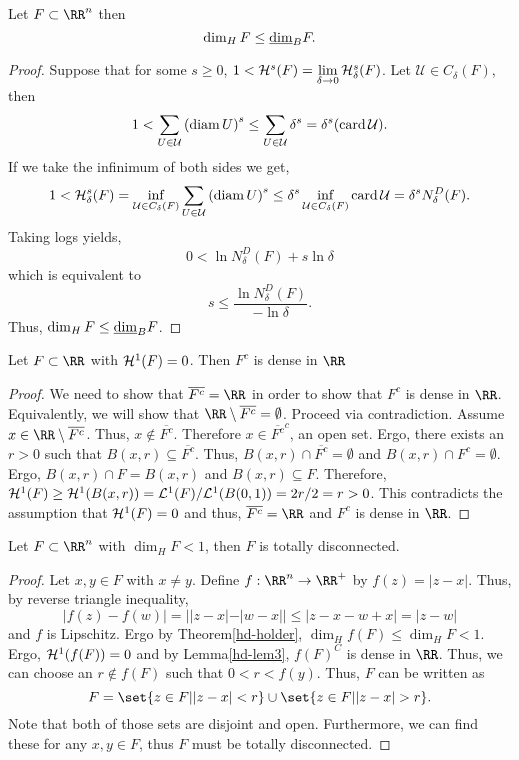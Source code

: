 \begin{thm}
	Let $F\subset\RR^n$ then
	\[
		\operatorname{dim}_H F \leq \underline{\operatorname{dim}}_B F.
	\]
\end{thm}
\begin{proof}
	Suppose that for some $s\geq 0$, $1<\mathcal{H}^s(F)=\lim\limits_{\delta\rightarrow 0}\mathcal{H}^s_\delta(F)$.
	Let $\mathcal{U}\in C_\delta(F)$, then
	\[
		1 < \sum_{U\in\mathcal{U}}{(\operatorname{diam} U)}^s
		\leq\sum_{U\in\mathcal{U}}\delta^s
		=\delta^s (\operatorname{card} \mathcal{U}).
	\]
	If we take the infinimum of both sides we get,
	\[
		1 < \mathcal{H}^s_\delta(F)
		=\inf_{\mathcal{U}\in C_\delta(F)}\sum_{U\in\mathcal{U}} {(\operatorname{diam}{U})}^s
		\leq \delta^s\inf_{\mathcal{U}\in C_\delta(F)}\operatorname{card}{\mathcal{U}}
		=\delta^s N_\delta^D(F).
	\]
	Taking logs yields,
	\[
		0 < \ln N_\delta^D(F)+s\ln \delta
	\]
	which is equivalent to
	\[
		s\leq \frac{\ln N^D_\delta(F)}{-\ln\delta}.
	\]
	Thus, $\operatorname{dim}_H F\leq \underline{\operatorname{dim}}_B F$.
\end{proof}

\begin{lemma}\label{hd-lem3}
	Let $F\subset\RR$ with $\mathcal{H}^1(F) = 0$.
	Then $F^c$ is dense in $\RR$
\end{lemma}

\begin{proof}
	We need to show that $\overline{F^c}=\RR$ in order to show that $F^c$ is dense in $\RR$.
	Equivalently, we will show that $\RR\setminus\overline{F^c}=\emptyset$.
	Proceed via contradiction.
	Assume $x\in\RR\setminus\overline{F^c}$.
	Thus, $x\notin\overline{F^c}$.
	Therefore $x\in{\overline{F^c}}^c$, an open set.
	Ergo, there exists an $r>0$ such that $B(x,r)\subseteq\overline{F^c}$.
	Thus, $B(x,r)\cap\overline{F^c}=\emptyset$ and $B(x,r)\cap F^c=\emptyset$.
	Ergo, $B(x,r)\cap F = B(x,r)$ and $B(x,r)\subseteq F$.
	Therefore, $\mathcal{H}^1(F)\geq\mathcal{H}^1(B(x,r))=\mathcal{L}^1(F)/\mathcal{L}^1(B(0,1))=2r/2=r>0$.
	This contradicts the assumption that $\mathcal{H}^1(F)=0$ and thus, $\overline{F^c}=\RR$ and $F^c$ is dense in $\RR$.
\end{proof}

\begin{thm}
	Let $F\subset\RR^n$ with $\dim_H F < 1$, then $F$ is totally disconnected.
\end{thm}

\begin{proof}
	Let $x,y\in F$ with $x\neq y$.
	Define $f:\RR^n\rightarrow\RR^+$ by $f(z)=|z-x|$.
	Thus, by reverse triangle inequality,
	\[
		|f(z)-f(w)|=||z-x|-|w-x||\leq|z-x-w+x|=|z-w|
	\]
	and $f$ is Lipschitz.
	Ergo by Theorem\autoref{hd-holder}, $\dim_H f(F) \leq \dim_H F < 1$.
	Ergo, $\mathcal{H}^1(f(F))=0$ and by Lemma\autoref{hd-lem3}, ${f(F)}^C$ is dense in $\RR$.
	Thus, we can choose an $r\notin f(F)$ such that $0<r<f(y)$.
	Thus, $F$ can be written as
	\[
		F=\set{z\in F| |z-x|< r}\cup\set{z\in F| |z-x| >r}.
	\]
	Note that both of those sets are disjoint and open.
	Furthermore, we can find these for any $x,y\in F$, thus $F$ must be totally disconnected.
\end{proof}

